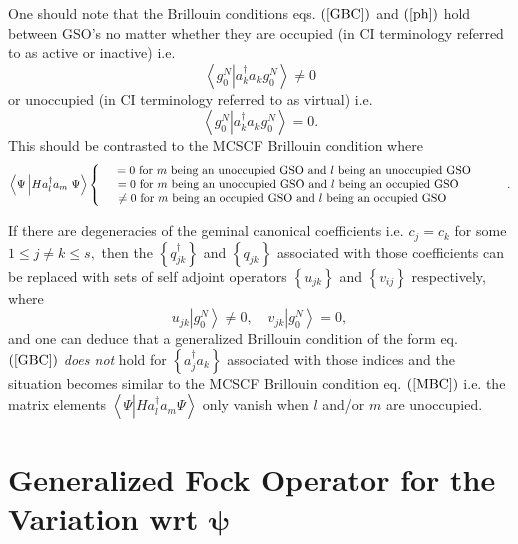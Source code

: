 \documentclass[aps,preprint]{revtex4}%
\begin{document}
One should note that the Brillouin conditions eqs. $\left(  \ref{GBC}\right)
$ and $\left(  \ref{ph}\right)  $ hold between GSO's no matter whether they
are occupied (in CI terminology referred to as active or inactive) i.e.
\begin{equation}
\left\langle g_{0}^{N}\left\vert a_{k}^{\dagger}a_{k}g_{0}^{N}\right.
\right\rangle \neq0
\end{equation}
or unoccupied (in CI terminology referred to as virtual) i.e.
\begin{equation}
\left\langle g_{0}^{N}\left\vert a_{k}^{\dagger}a_{k}g_{0}^{N}\right.
\right\rangle =0.
\end{equation}
This should be contrasted to the MCSCF Brillouin condition where
\begin{equation}
\left\langle \Psi\left\vert Ha_{l}^{\dagger}a_{m}\right.  \Psi\right\rangle
\left\{
\begin{array}
[c]{c}%
\quad=0\text{ for }m\text{ being an unoccupied GSO and }l\text{ being an
unoccupied GSO \quad\quad}\\
=0\text{ for }m\text{ being an unoccupied GSO and }l\text{ being an occupied
GSO \quad\quad}\\
\neq0\text{ for }m\text{ being an occupied GSO and }l\text{ being an occupied
GSO\quad\quad\quad\ }%
\end{array}
\right.  . \label{MBC}%
\end{equation}


If there are degeneracies of the geminal canonical coefficients i.e.
$c_{j}=c_{k}$ for some $1\leq j\neq k\leq s,$ then the $\left\{
q_{jk}^{\dagger}\right\}  $ and $\left\{  q_{jk}\right\}  $ associated with
those coefficients can be replaced \cite{Goscinski82a} with sets of self
adjoint operators $\left\{  u_{jk}\right\}  $ and $\left\{  v_{ij}\right\}  $
respectively, where
\begin{equation}
u_{jk}\left\vert g_{0}^{N}\right\rangle \neq0,\quad v_{jk}\left\vert g_{0}%
^{N}\right\rangle =0,
\end{equation}
and one can deduce that a generalized Brillouin condition of the form eq.
$\left(  \ref{GBC}\right)  $ \emph{does not} hold for $\left\{  a_{j}%
^{\dagger}a_{k}\right\}  $ associated with those indices and the situation
becomes similar to the MCSCF Brillouin condition eq. $\left(  \ref{MBC}%
\right)  $ i.e. the matrix elements $\left\langle \Psi\left\vert
Ha_{l}^{\dagger}a_{m}\right.  \Psi\right\rangle $ only vanish when $l$ and/or
$m$ are unoccupied.

\section{Generalized Fock Operator \label{Fock} for the Variation wrt
$\bm{\psi}$}
\end{document}

